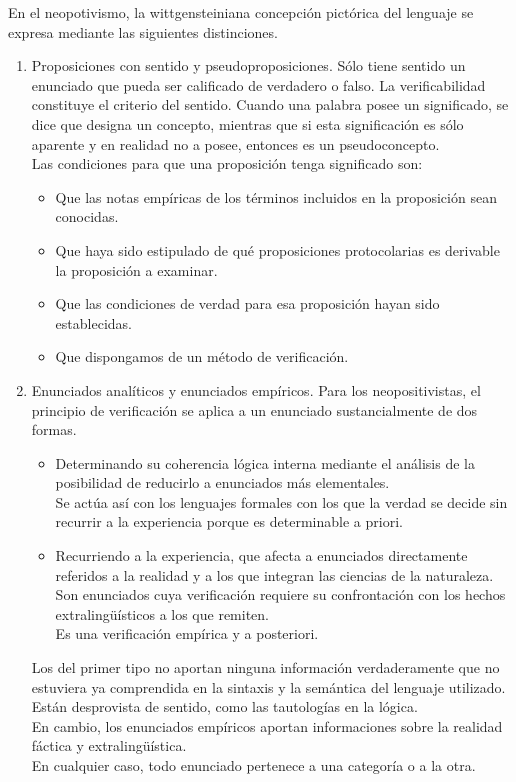 \documentclass[a4paper, 11pt, twocolumn, spanish]{article}
\begin{document}
En el neopotivismo, la wittgensteiniana concepción pictórica del
lenguaje se expresa mediante las siguientes distinciones.
\begin{enumerate}
\item Proposiciones con sentido y pseudoproposiciones. Sólo tiene
sentido un enunciado que pueda ser calificado de verdadero o
falso. La verificabilidad constituye el criterio del
sentido. Cuando una palabra posee un significado, se dice que
designa un concepto, mientras que si esta significación es sólo
aparente y en realidad no a posee, entonces es un
pseudoconcepto.\\[0pt]
Las condiciones para que una proposición tenga significado son:
\begin{itemize}
\item Que las notas empíricas de los términos incluidos en la
proposición sean conocidas.
\item Que haya sido estipulado de qué proposiciones protocolarias es
derivable la proposición a examinar.
\item Que las condiciones de verdad para esa proposición hayan sido
establecidas.
\item Que dispongamos de un método de verificación.
\end{itemize}

\item Enunciados analíticos y enunciados empíricos. Para los
neopositivistas, el principio de verificación se aplica a un
enunciado sustancialmente de dos formas.
\begin{itemize}
\item Determinando su coherencia lógica interna mediante el análisis
de la posibilidad de reducirlo a enunciados más elementales.\\[0pt]
Se actúa así con los lenguajes formales con los que la verdad
se decide sin recurrir a la experiencia porque es determinable
a priori.\\[0pt]

\item Recurriendo a la experiencia, que afecta a enunciados
directamente referidos a la realidad y a los que integran las
ciencias de la naturaleza.\\[0pt]
Son enunciados cuya verificación requiere su confrontación con
los hechos extralingüísticos a los que remiten.\\[0pt]
Es una verificación empírica y a posteriori.
\end{itemize}

Los del primer tipo no aportan ninguna información verdaderamente
que no estuviera ya comprendida en la sintaxis y la semántica del
lenguaje utilizado. Están desprovista de sentido, como las
tautologías en la lógica.\\[0pt]
En cambio, los enunciados empíricos aportan informaciones sobre la
realidad fáctica y extralingüística.\\[0pt]
En cualquier caso, todo enunciado pertenece a una categoría o a la
otra.\\[0pt]


\end{enumerate}
\end{document}
